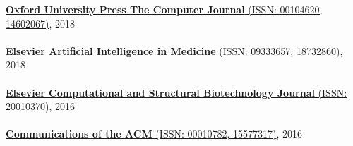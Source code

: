 \href{https://academic.oup.com/comjnl}{\textbf{Oxford University Press The Computer Journal} (ISSN: 00104620, 14602067)}, 2018
\\ \halfblankline \\
\href{https://www.journals.elsevier.com/artificial-intelligence-in-medicine/}{\textbf{Elsevier Artificial Intelligence in Medicine} (ISSN: 09333657, 18732860)}, 2018
\\ \halfblankline \\
\href{https://www.journals.elsevier.com/computational-and-structural-biotechnology-journal/}{\textbf{Elsevier Computational and Structural Biotechnology Journal} (ISSN: 20010370)}, 2016
\\ \halfblankline \\
\href{http://cacm.acm.org/}{\textbf{Communications of the ACM} (ISSN: 00010782, 15577317)}, 2016
